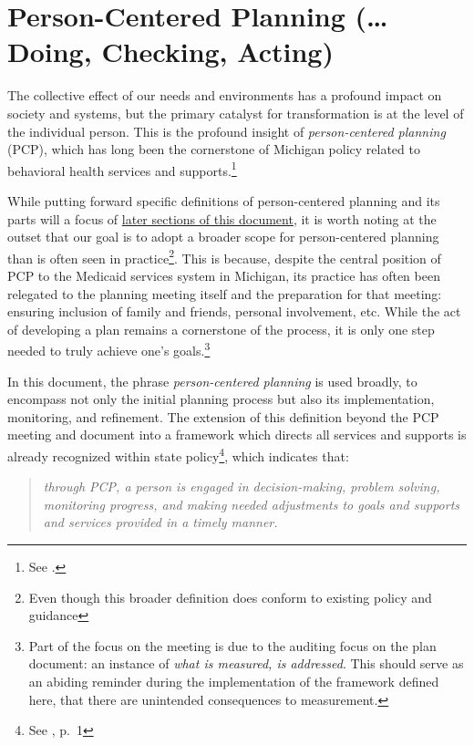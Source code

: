 \documentclass[
]{book}
\begin{document}
\hypertarget{pcpdca}{%
\chapter{Person-Centered Planning (\ldots{}Doing, Checking, Acting)}\label{pcpdca}}

The collective effect of our needs and environments has a profound impact on society and systems, but the primary catalyst for transformation is at the level of the individual person. This is the profound insight of \emph{person-centered planning} (PCP), which has long been the cornerstone of Michigan policy related to behavioral health services and supports.\footnote{See \citet{mi-mhc}.}

While putting forward specific definitions of person-centered planning and its parts will a focus of \protect\hyperlink{bok}{later sections of this document}, it is worth noting at the outset that our goal is to adopt a broader scope for person-centered planning than is often seen in practice\footnote{Even though this broader definition does conform to existing policy and guidance}. This is because, despite the central position of PCP to the Medicaid services system in Michigan, its practice has often been relegated to the planning meeting itself and the preparation for that meeting: ensuring inclusion of family and friends, personal involvement, etc. While the act of developing a plan remains a cornerstone of the process, it is only one step needed to truly achieve one's goals.\footnote{Part of the focus on the meeting is due to the auditing focus on the plan document: an instance of \emph{what is measured, is addressed}. This should serve as an abiding reminder during the implementation of the framework defined here, that there are unintended consequences to measurement.}

In this document, the phrase \emph{person-centered planning} is used broadly, to encompass not only the initial planning process but also its implementation, monitoring, and refinement. The extension of this definition beyond the PCP meeting and document into a framework which directs all services and supports is already recognized within state policy\footnote{See \citet{pcp-policy}, p.~1}, which indicates that:

\begin{quote}
\emph{through PCP, a person is engaged in decision-making, problem solving, monitoring progress, and making needed adjustments to goals and supports and services provided in a timely manner.}
\end{quote}
\end{document}
